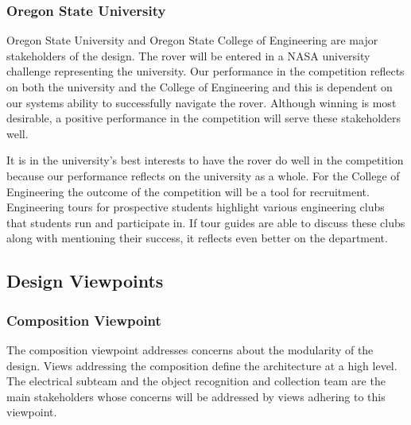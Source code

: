 \documentclass[10pt, oneside,onecolumn]{IEEEtran}
\begin{document}
\subsubsection{Oregon State University}

Oregon State University and Oregon State College of Engineering are major stakeholders of the design. The rover will be entered in a NASA university challenge representing the university. Our performance in the competition reflects on both the university and the College of Engineering and this is dependent on our systems ability to successfully navigate the rover. Although winning is most desirable, a positive performance in the competition will serve these stakeholders well.

It is in the university's best interests to have the rover do well in the competition because our performance reflects on the university as a whole. For the College of Engineering the outcome of the competition will be a tool for recruitment. Engineering tours for prospective students highlight various engineering clubs that students run and participate in. If tour guides are able to discuss these clubs along with mentioning their success, it reflects even better on the department.

\subsection{Design Viewpoints}

\subsubsection{Composition Viewpoint}

The composition viewpoint addresses concerns about the modularity of the design. Views addressing the composition define the architecture at a high level. The electrical subteam and the object recognition and collection team are the main stakeholders whose concerns will be addressed by views adhering to this viewpoint. 
\end{document}
